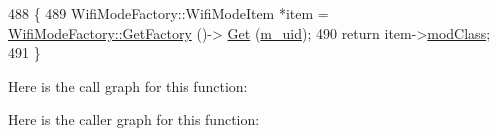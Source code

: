 \begin{DoxyCode}
488 \{
489   WifiModeFactory::WifiModeItem *item = \hyperlink{classns3_1_1WifiModeFactory_a9c6f695d733355dee8d74bd1709868fc}{WifiModeFactory::GetFactory} ()->
      \hyperlink{classns3_1_1WifiModeFactory_a3086868810ff4347e31c63027726f544}{Get} (\hyperlink{classns3_1_1WifiMode_ad63e4633ba59d019abfb07de0858727f}{m\_uid});
490   \textcolor{keywordflow}{return} item->\hyperlink{structns3_1_1WifiModeFactory_1_1WifiModeItem_a0fce98678066197ced8149610525c018}{modClass};
491 \}
\end{DoxyCode}


Here is the call graph for this function\+:




Here is the caller graph for this function\+:


